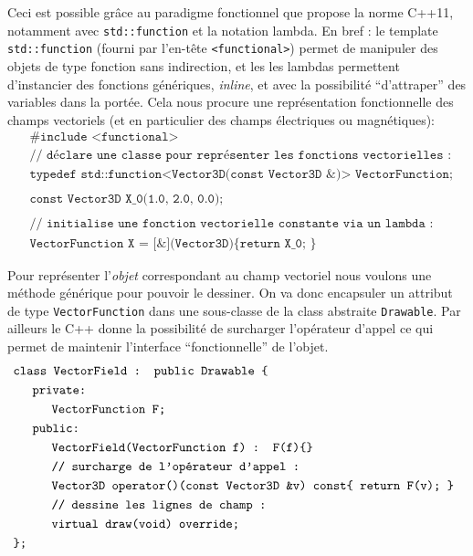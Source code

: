 \documentclass[12pt, letterpaper, twoside]{article}
\newcommand{\T}[1]{\texttt{#1}}
\begin{document}
Ceci est possible grâce au paradigme fonctionnel que propose la norme C++11, notamment avec \T{std::function} et la notation lambda. En bref : le template \T{std::function} (fourni par l'en-tête \T{<functional>}) permet de manipuler des objets de type fonction sans indirection, et les les lambdas permettent d'instancier des fonctions génériques, \textit{inline}, et avec la possibilité ``d'attraper'' des variables dans la portée. Cela nous procure une représentation fonctionnelle des champs vectoriels (et en particulier des champs électriques ou magnétiques):
\begin{align*}
	&\T{\#include <functional>}\\
	&\T{// déclare une classe pour représenter les fonctions vectorielles : }\\
	&\T{typedef std::function<Vector3D(const Vector3D \&)> VectorFunction;}\\ \\
	&\T{const Vector3D X\_0(1.0, 2.0, 0.0);}\\ \\
	&\T{// initialise une fonction vectorielle constante via un lambda : }\\
	&\T{VectorFunction X = [\&](Vector3D)\{ return X\_0; \}}
\end{align*}

\noindent Pour représenter l'\textit{objet} correspondant au champ vectoriel nous voulons une méthode générique pour pouvoir le dessiner. On va donc encapsuler un attribut de type \T{VectorFunction} dans une sous-classe de la class abstraite \T{Drawable}. Par ailleurs le C++ donne la possibilité de surcharger l'opérateur d'appel ce qui permet de maintenir l'interface ``fonctionnelle'' de l'objet.
\begin{align*}
	&\T{class VectorField : public Drawable \{}\\
	&\indent \T{private:}\\
	& \indent \indent \T{VectorFunction F;}\\
	&\indent \T{public:}\\
	& \indent \indent \T{VectorField(VectorFunction f) : F(f)\{\}}\\
	& \indent \indent \T{// surcharge de l'opérateur d'appel :}\\
	& \indent \indent \T{Vector3D operator()(const Vector3D \&v)\ const\{ return F(v); \} }\\
	& \indent \indent \T{// dessine les lignes de champ :}\\
	& \indent \indent \T{virtual draw(void) override;}\\
	& \T{\};}
\end{align*}
\end{document}
